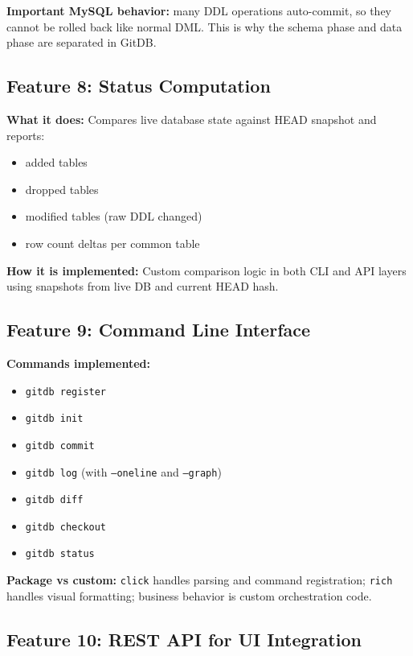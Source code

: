 \documentclass[12pt, a4paper]{article}
\begin{document}
\begin{tcolorbox}[warningbox]
\textbf{Important MySQL behavior:} many DDL operations auto-commit, so they cannot be
rolled back like normal DML. This is why the schema phase and data phase are
separated in GitDB.
\end{tcolorbox}

\subsection{Feature 8: Status Computation}

\textbf{What it does:}
Compares live database state against HEAD snapshot and reports:
\begin{itemize}[leftmargin=1.5em]
    \item added tables
    \item dropped tables
    \item modified tables (raw DDL changed)
    \item row count deltas per common table
\end{itemize}

\textbf{How it is implemented:}
Custom comparison logic in both CLI and API layers using snapshots from live DB
and current HEAD hash.

\subsection{Feature 9: Command Line Interface}

\textbf{Commands implemented:}
\begin{itemize}[leftmargin=1.5em]
    \item \texttt{gitdb register}
    \item \texttt{gitdb init}
    \item \texttt{gitdb commit}
    \item \texttt{gitdb log} (with \texttt{--oneline} and \texttt{--graph})
    \item \texttt{gitdb diff}
    \item \texttt{gitdb checkout}
    \item \texttt{gitdb status}
\end{itemize}

\textbf{Package vs custom:}
\texttt{click} handles parsing and command registration; \texttt{rich} handles
visual formatting; business behavior is custom orchestration code.

\subsection{Feature 10: REST API for UI Integration}
\end{document}
